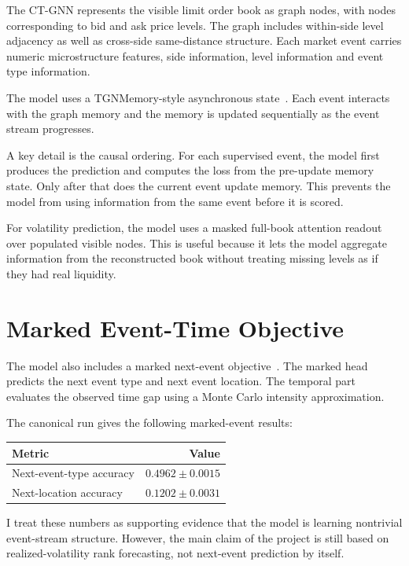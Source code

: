 \documentclass[11pt]{article}
\begin{document}
The CT-GNN represents the visible limit order book as graph nodes, with nodes corresponding to bid and ask price levels. The graph includes within-side level adjacency as well as cross-side same-distance structure. Each market event carries numeric microstructure features, side information, level information and event type information.

The model uses a TGNMemory-style asynchronous state~\cite{rossi2020tgn,pytorchgeometric}. Each event interacts with the graph memory and the memory is updated sequentially as the event stream progresses.

A key detail is the causal ordering. For each supervised event, the model first produces the prediction and computes the loss from the pre-update memory state. Only after that does the current event update memory. This prevents the model from using information from the same event before it is scored.

For volatility prediction, the model uses a masked full-book attention readout over populated visible nodes. This is useful because it lets the model aggregate information from the reconstructed book without treating missing levels as if they had real liquidity.

\section{Marked Event-Time Objective}

The model also includes a marked next-event objective~\cite{hawkes1971spectra,mei2017neuralhawkes}. The marked head predicts the next event type and next event location. The temporal part evaluates the observed time gap using a Monte Carlo intensity approximation.

The canonical run gives the following marked-event results:

\begin{center}
\begin{tabular}{lr}
\toprule
Metric & Value \\
\midrule
Next-event-type accuracy & $0.4962 \pm 0.0015$ \\
Next-location accuracy & $0.1202 \pm 0.0031$ \\
\bottomrule
\end{tabular}
\end{center}

I treat these numbers as supporting evidence that the model is learning nontrivial event-stream structure. However, the main claim of the project is still based on realized-volatility rank forecasting, not next-event prediction by itself.
\end{document}
